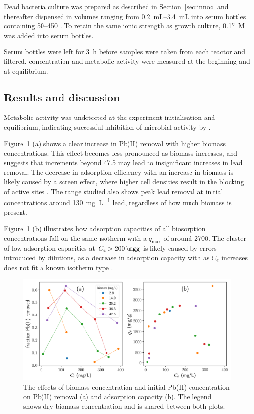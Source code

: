 Dead bacteria culture was prepared as described in Section~\ref{sec:innoc} and thereafter dispensed in volumes ranging from \SIrange{0.2}{3.4}{\milli\liter} into serum bottles containing \SIrange{50}{450}{\mgpl} . To retain the same ionic strength as growth culture, \SI{0.17}{M}  was added into serum bottles.

Serum bottles were left for \SI{3}{\hour} before samples were taken from each reactor and filtered.  concentration and metabolic activity were measured at the beginning and at equilibrium.


\subsection{Results and discussion}

Metabolic activity was undetected at the experiment initialisation and equilibrium, indicating successful inhibition of microbial activity by .

Figure~\ref{fig:conc-vs-rem} (a) shows a clear increase in Pb(II) removal with higher biomass concentrations. This effect becomes less pronounced as biomass increases, and suggests that increments beyond \SI{47.5}{\mgpl} may lead to insignificant increases in lead removal. The decrease in adsorption efficiency with an increase in biomass is likely caused by a screen effect, where higher cell densities result in the blocking of active sites \parencite{Hammaini2007}. The range studied also shows peak lead removal at initial concentrations around \SI{130}{\milli\gram\per\liter} lead, regardless of how much biomass is present.

Figure~\ref{fig:conc-vs-rem} (b) illustrates how adsorption capacities of all biosorption concentrations fall on the same isotherm with a $q_\textrm{max}$ of around \SI{2700}{\mgg}. The cluster of low adsorption capacities at $C_e > \SI{200}{\mgg}$ is likely caused by errors introduced by dilutions, as a decrease in adsorption capacity with as $C_e$ increases does not fit a known isotherm type \parencite{Alothman2012}.

\begin{figure}[tbph!]
	\centering
	\includegraphics[width=1\linewidth]{Experimental/Pics/conc-vs-rem}
	\caption{The effects of biomass concentration and initial Pb(II) concentration on Pb(II) removal (a) and adsorption capacity (b). The legend shows dry biomass concentration and is shared between both plots.}
	\label{fig:conc-vs-rem}
\end{figure}






